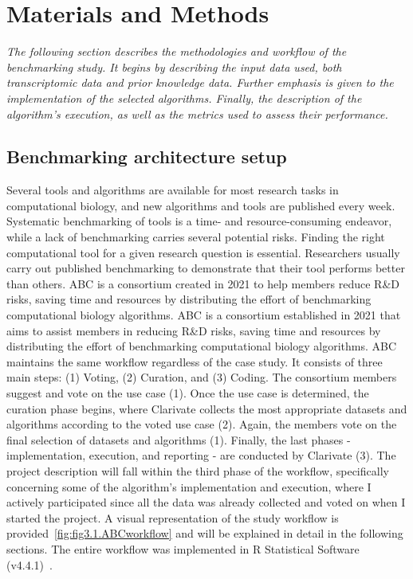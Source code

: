 ﻿%

%


\chapter{Materials and Methods}
\label{cha:materialsandmethods}


\textit{The following section describes the methodologies and workflow of the benchmarking study. It begins by describing the input data used, both transcriptomic data and prior knowledge data. Further emphasis is given to the implementation of the selected algorithms. Finally, the description of the algorithm's execution, as well as the metrics used to assess their performance.}

\section{Benchmarking architecture setup} %
\label{sec:benchmarkingarchitecturesetup}

Several tools and algorithms are available for most research tasks in computational biology, and new algorithms and tools are published every week. Systematic benchmarking of tools is a time- and resource-consuming endeavor, while a lack of benchmarking carries several potential risks. Finding the right computational tool for a given research question is essential. Researchers usually carry out published benchmarking to demonstrate that their tool performs better than others. \gls{ABC} is a consortium created in 2021 to help members reduce R\&D risks, saving time and resources by distributing the effort of benchmarking computational biology algorithms. \gls{ABC} is a consortium established in 2021 that aims to assist members in reducing R\&D risks, saving time and resources by distributing the effort of benchmarking computational biology algorithms. \gls{ABC} maintains the same workflow regardless of the case study. It consists of three main steps: (1) Voting, (2) Curation, and (3) Coding. The consortium members suggest and vote on the use case (1). Once the use case is determined, the curation phase begins, where Clarivate collects the most appropriate datasets and algorithms according to the voted use case (2). Again, the members vote on the final selection of datasets and algorithms (1). Finally, the last phases - implementation, execution, and reporting - are conducted by Clarivate (3). 
The project description will fall within the third phase of the workflow, specifically concerning some of the algorithm's implementation and execution, where I actively participated since all the data was already collected and voted on when I started the project. A visual representation of the study workflow is provided~\ref{fig:fig3.1.ABCworkflow} and will be explained in detail in the following sections. The entire workflow was implemented in \gls{R} Statistical Software (v4.4.1)~\cite{RN159}.

